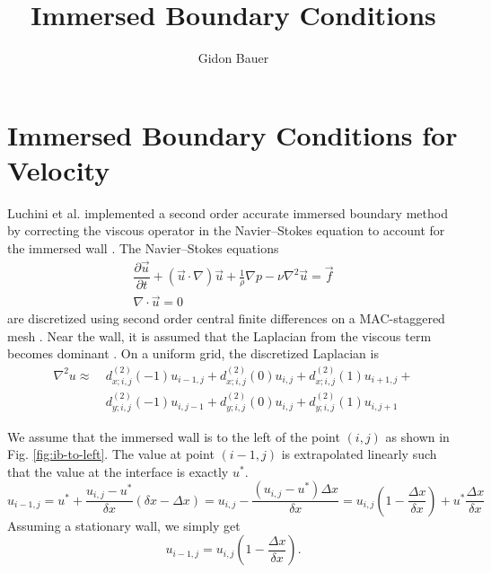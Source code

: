 \documentclass{article}
\title{Immersed Boundary Conditions}
\author{Gidon Bauer}
\numberwithin{equation}{section}
\newcommand{\pd}[2]{\dfrac{\partial #1}{\partial #2}}
\begin{document}


\maketitle

\section{Immersed Boundary Conditions for Velocity}

Luchini et al. implemented a second order accurate immersed boundary method by correcting the viscous operator in the Navier--Stokes equation to account for the immersed wall \cite{luchiniSimpleEfficientSecondorder2025}.
The Navier--Stokes equations
\begin{equation}
    \begin{gathered}
        \pd{\vec{u}}{t}
        + \left(\vec{u} \cdot \nabla\right) \vec{u}
        + \frac1\rho \nabla p
        - \nu \nabla^2 \vec{u}
        = \vec{f} \\
        \nabla \cdot \vec{u} = 0
    \end{gathered}
    \label{eq:navier-stokes}
\end{equation}
are discretized using second order central finite differences on a MAC-staggered mesh \cite{luchiniSimpleEfficientSecondorder2025,harlowMAC1965}.
Near the wall, it is assumed that the Laplacian from the viscous term becomes dominant \cite{luchiniSimpleEfficientSecondorder2025}.
On a uniform grid, the discretized Laplacian is
\begin{equation}
    \begin{split}
        \nabla^2 u \approx
        \ &d^{(2)}_{x;i,j}(-1) u_{i-1,j}
        + d^{(2)}_{x;i,j}( 0) u_{i,  j}
        + d^{(2)}_{x;i,j}( 1) u_{i+1,j}
        + \\ &d^{(2)}_{y;i,j}(-1) u_{i,j-1}
        + d^{(2)}_{y;i,j}( 0) u_{i,j  }
        + d^{(2)}_{y;i,j}( 1) u_{i,j+1}
    \end{split}
    \label{eq:discrete_laplacian}
\end{equation}

We assume that the immersed wall is to the left of the point $(i,j)$ as shown in Fig. \ref{fig:ib-to-left}.
The value at point $(i-1,j)$ is extrapolated linearly such that the value at the interface is exactly $u^*$.
\begin{equation}
    u_{i-1,j} = u^* + \frac{u_{i,j} - u^*}{\delta x} (\delta x - \Delta x)
    = u_{i,j} - \frac{(u_{i,j} - u^*) \Delta x}{\delta x}
    = u_{i,j} \left(1 - \frac{\Delta x}{\delta x}\right) + u^* \frac{\Delta x}{\delta x}
\end{equation}
Assuming a stationary wall, we simply get
\begin{equation}
    u_{i-1,j} = u_{i,j} \left(1 - \frac{\Delta x}{\delta x}\right).
\end{equation}
\end{document}
